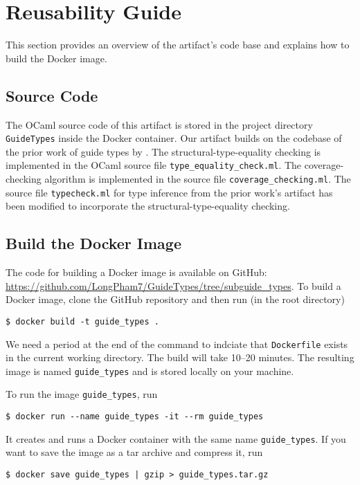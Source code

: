 
\section{Reusability Guide}

This section provides an overview of the artifact's code base and explains how
to build the Docker image.

\subsection{Source Code}
\label{sec:Source Code}

The OCaml source code of this artifact is stored in the project directory
\texttt{GuideTypes} inside the Docker container.
%
Our artifact builds on the codebase of the prior work of guide types by
\citeauthor{PLDI:WHR21B}.
%
The structural-type-equality checking is implemented in the OCaml source file
\texttt{type\_equality\_check.ml}.
%
The coverage-checking algorithm is implemented in the source file
\texttt{coverage\_checking.ml}.
%
The source file \texttt{typecheck.ml} for type inference from the prior work's
artifact has been modified to incorporate the structural-type-equality checking.

\subsection{Build the Docker Image}
\label{sec:Build the Docker Image}

The code for building a Docker image is available on GitHub:
\url{https://github.com/LongPham7/GuideTypes/tree/subguide_types}.
%
To build a Docker image, clone the GitHub repository and then run (in the root
directory)
\begin{verbatim}
$ docker build -t guide_types .
\end{verbatim}
%
We need a period at the end of the command to indciate that \texttt{Dockerfile}
exists in the current working directory.
%
The build will take 10--20 minutes.
%
The resulting image is named \texttt{guide\_types} and is stored locally on your
machine.

To run the image \texttt{guide\_types}, run
\begin{verbatim}
$ docker run --name guide_types -it --rm guide_types
\end{verbatim}
%
It creates and runs a Docker container with the same name \texttt{guide\_types}.
%
If you want to save the image as a tar archive and compress it, run
\begin{verbatim}
$ docker save guide_types | gzip > guide_types.tar.gz
\end{verbatim}
